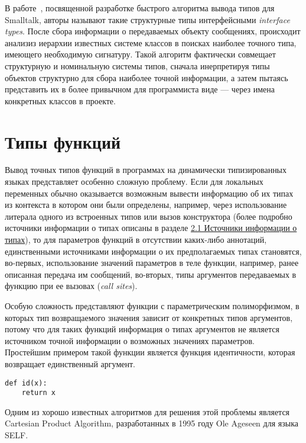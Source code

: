 В работе~\cite{Pluquet2009}, посвященной разработке быстрого алгоритма вывода
типов для Smalltalk, авторы называют такие структурные типы интерфейсными 
\emph{interface types}. После сбора информации о передаваемых объекту сообщениях,
происходит анализиз иерархии известных системе классов в поисках наиболее
точного типа, имеющего необходимую сигнатуру. Такой алгоритм фактически
совмещает структурную и номинальную системы типов, сначала инерпретируя типы
объектов структурно для сбора наиболее точной информации, а затем пытаясь
представить их в более привычном для программиста виде --- через имена
конкретных классов в проекте.

\section{Типы функций}

Вывод точных типов функций в программах на динамически типизированных языках
представляет особенно сложную проблему. Если для локальных переменных обычно
оказывается возможным вывести информацию об их типах из контекста в котором они
были определены, например, через использование литерала одного из встроенных
типов или вызов конструктора (более подробно источники информации о типах
описаны в разделе \hyperref[sec:type-sources]{2.1 Источники информации о типах}), то
для параметров функций в отсутствии каких-либо аннотаций, единственными
источниками информации о их предполагаемых типах становятся, во-первых,
использование значений параметров в теле функции, например, ранее описанная
передача им сообщений, во-вторых, типы аргументов передаваемых в функцию при ее
вызовах (\emph{call sites}).

Особую сложность представляют функции с параметрическим полиморфизмом, в
которых тип возвращаемого значения зависит от конкретных типов аргументов, 
потому что для таких функций информация о типах аргументов не является
источником точной информации о возможных значениях параметров.
Простейшим примером такой функции является функция идентичности,
которая возвращает единственный аргумент.

\begin{lstlisting}
def id(x):
    return x
\end{lstlisting}

Одним из хорошо известных алгоритмов для решения этой проблемы является 
Cartesian Product Algorithm, разработанных в 1995 году Ole Ageseen для языка
SELF.


